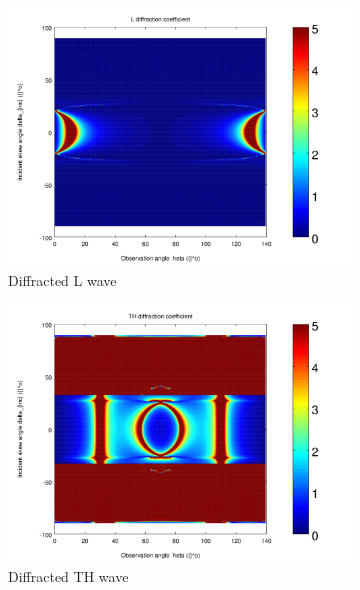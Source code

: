 \begin{figure}
\centering
\begin{subfigure}[b]{0.32\textwidth}
        \includegraphics[width=\textwidth]{images/chapter4/Resultats_3D/XpropL_140_70_TH.png}
        \caption{Diffracted L wave}
        \label{Resultat_3D:DL}
    \end{subfigure}
\begin{subfigure}[b]{0.32\textwidth}
        \includegraphics[width=\textwidth]{images/chapter4/Resultats_3D/XpropTH_140_70_TH.png}
        \caption{Diffracted TH wave}
        \label{Resultat_3D:DTH}
    \end{subfigure}
   \begin{subfigure}[b]{0.32\textwidth}

\end{subfigure}
\end{figure}
